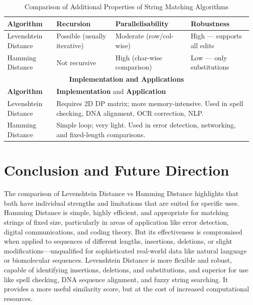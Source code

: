 \documentclass[conference]{IEEEtran}
\begin{document}
\begin{table}[htbp]
\caption{Comparison of Additional Properties of String Matching Algorithms}
\centering
\scriptsize
\renewcommand{\arraystretch}{1.3}
\begin{tabular}{|p{2.2cm}|p{1.8cm}|p{2cm}|p{1.6cm}|}
\hline
\textbf{Algorithm} & \textbf{Recursion} & \textbf{Parallelisability} & \textbf{Robustness} \\
\hline
Levenshtein Distance & Possible (usually iterative) & Moderate (row/col-wise) & High — supports all edits \\
\hline
Hamming Distance & Not recursive & High (char-wise comparison) & Low — only substitutions \\
\hline
\multicolumn{4}{|c|}{\textbf{Implementation and Applications}} \\
\hline
\textbf{Algorithm} & \multicolumn{3}{p{5.4cm}|}{\centering \textbf{Implementation} and \textbf{Application}} \\
\hline
Levenshtein Distance & \multicolumn{3}{p{5.4cm}|}{
Requires 2D DP matrix; more memory-intensive. Used in spell checking, DNA alignment, OCR correction, NLP.
} \\
\hline
Hamming Distance & \multicolumn{3}{p{5.4cm}|}{
Simple loop; very light. Used in error detection, networking, and fixed-length comparisons.
} \\
\hline
\end{tabular}
\label{tab:str}
\end{table}



\section{Conclusion and Future Direction}
The comparison of Levenshtein Distance vs Hamming Distance highlights that both have individual strengths and limitations that are suited for specific uses. Hamming Distance is simple, highly efficient, and appropriate for matching strings of fixed size, particularly in areas of application like error detection, digital communications, and coding theory. But its effectiveness is compromised when applied to sequences of different lengths, insertions, deletions, or slight modifications—unqualified for sophisticated real-world data like natural language or biomolecular sequences. Levenshtein Distance is more flexible and robust, capable of identifying insertions, deletions, and substitutions, and superior for use like spell checking, DNA sequence alignment, and fuzzy string searching. It provides a more useful similarity score, but at the cost of increased computational resources.
\end{document}
